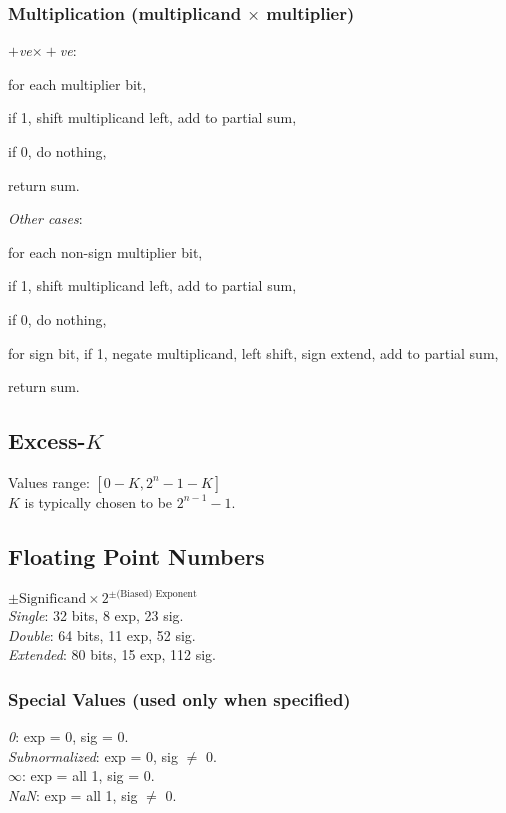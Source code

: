 \subsubsection*{Multiplication (multiplicand $\times$ multiplier)}
\emph{$+$ve$\times+$ve}: \begin{enumerate*}[label=(\arabic*)]
    \item for each multiplier bit,
    \item if 1, shift multiplicand left, add to partial sum,
    \item if 0, do nothing,
    \item return sum.
\end{enumerate*}
\emph{Other cases}: \begin{enumerate*}[label=(\arabic*)]
    \item for each non-sign multiplier bit,
    \item if 1, shift multiplicand left, add to partial sum,
    \item if 0, do nothing,
    \item for sign bit, if 1, negate multiplicand, left shift, sign extend, add to partial sum,
    \item return sum.
\end{enumerate*}

\subsection*{Excess-$K$}
Values range: $[0-K, 2^n-1-K]$\\
$K$ is typically chosen to be $2^{n-1} - 1$.

\subsection*{Floating Point Numbers}
$\pm\text{Significand}\times2^{\pm\text{(Biased) Exponent}}$\\
\emph{Single}: 32 bits, 8 exp, 23 sig.\\
\emph{Double}: 64 bits, 11 exp, 52 sig.\\
\emph{Extended}: 80 bits, 15 exp, 112 sig.

\subsubsection*{Special Values (used only when specified)}
\emph{0}: exp = 0, sig = 0.\\
\emph{Subnormalized}: exp = 0, sig $\neq$ 0.\\
\emph{$\infty$}: exp = all 1, sig = 0.\\
\emph{NaN}: exp = all 1, sig $\neq$ 0.

